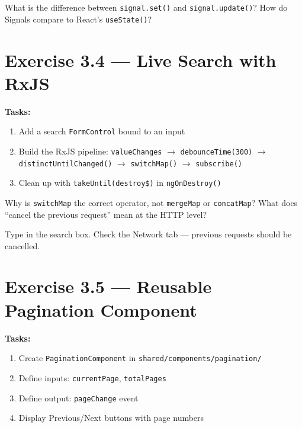 \documentclass[12pt,a4paper]{report}
\begin{document}
\begin{thinkbox}
What is the difference between \texttt{signal.set()} and \texttt{signal.update()}? How do Signals compare to React's \texttt{useState()}?
\end{thinkbox}

\section{Exercise 3.4 --- Live Search with RxJS}

\textbf{Tasks:}
\begin{enumerate}
    \item Add a search \texttt{FormControl} bound to an input
    \item Build the RxJS pipeline: \texttt{valueChanges} $\to$ \texttt{debounceTime(300)} $\to$ \texttt{distinctUntilChanged()} $\to$ \texttt{switchMap()} $\to$ \texttt{subscribe()}
    \item Clean up with \texttt{takeUntil(destroy\$)} in \texttt{ngOnDestroy()}
\end{enumerate}

\begin{thinkbox}
Why is \texttt{switchMap} the correct operator, not \texttt{mergeMap} or \texttt{concatMap}? What does ``cancel the previous request'' mean at the HTTP level?
\end{thinkbox}

\begin{checkpoint}
Type in the search box. Check the Network tab --- previous requests should be cancelled.
\end{checkpoint}

\section{Exercise 3.5 --- Reusable Pagination Component}

\textbf{Tasks:}
\begin{enumerate}
    \item Create \texttt{PaginationComponent} in \texttt{shared/components/pagination/}
    \item Define inputs: \texttt{currentPage}, \texttt{totalPages}
    \item Define output: \texttt{pageChange} event
    \item Display Previous/Next buttons with page numbers
\end{enumerate}
\end{document}
